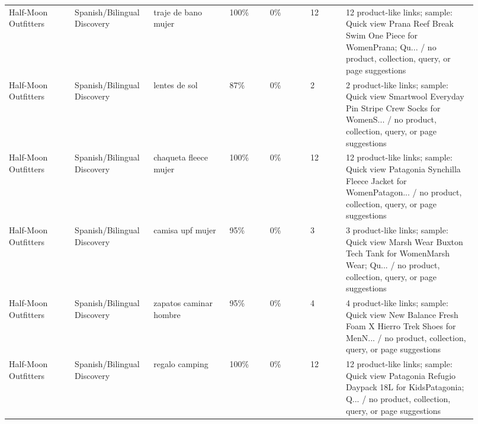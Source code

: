 \documentclass[10pt]{article}
\begin{document}
{\begin{longtable}{@{}L{0.13\linewidth}L{0.15\linewidth}L{0.15\linewidth}R{0.08\linewidth}R{0.08\linewidth}R{0.07\linewidth}L{0.26\linewidth}@{}}
Half-Moon Outfitters & Spanish/Bilingual Discovery & traje de bano mujer & 100\% & 0\% & 12 & 12 product-like links; sample: Quick view Prana Reef Break Swim One Piece for WomenPrana; Qu... / no product, collection, query, or page suggestions\\
Half-Moon Outfitters & Spanish/Bilingual Discovery & lentes de sol & 87\% & 0\% & 2 & 2 product-like links; sample: Quick view Smartwool Everyday Pin Stripe Crew Socks for WomenS... / no product, collection, query, or page suggestions\\
Half-Moon Outfitters & Spanish/Bilingual Discovery & chaqueta fleece mujer & 100\% & 0\% & 12 & 12 product-like links; sample: Quick view Patagonia Synchilla Fleece Jacket for WomenPatagon... / no product, collection, query, or page suggestions\\
Half-Moon Outfitters & Spanish/Bilingual Discovery & camisa upf mujer & 95\% & 0\% & 3 & 3 product-like links; sample: Quick view Marsh Wear Buxton Tech Tank for WomenMarsh Wear; Qu... / no product, collection, query, or page suggestions\\
Half-Moon Outfitters & Spanish/Bilingual Discovery & zapatos caminar hombre & 95\% & 0\% & 4 & 4 product-like links; sample: Quick view New Balance Fresh Foam X Hierro Trek Shoes for MenN... / no product, collection, query, or page suggestions\\
Half-Moon Outfitters & Spanish/Bilingual Discovery & regalo camping & 100\% & 0\% & 12 & 12 product-like links; sample: Quick view Patagonia Refugio Daypack 18L for KidsPatagonia; Q... / no product, collection, query, or page suggestions\\
\bottomrule
\end{longtable}
}
\end{document}
